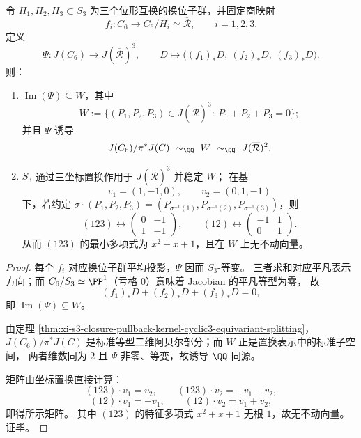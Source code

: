 \begin{proposition}\label{prop:xi-s3-closure-standard-isotypic-explicit-r3-realization}
令 \(H_1,H_2,H_3\subset S_3\) 为三个位形互换的换位子群，并固定商映射
\[
f_i:C_6\to C_6/H_i\simeq \overline{\mathcal R},\qquad i=1,2,3.
\]
定义
\[
\Psi:J(C_6)\longrightarrow J(\overline{\mathcal R})^3,\qquad
D\longmapsto \bigl((f_1)_*D,\ (f_2)_*D,\ (f_3)_*D\bigr).
\]
则：
\begin{enumerate}
  \item \(\operatorname{Im}(\Psi)\subseteq W\)，其中
  \[
  W:=\{(P_1,P_2,P_3)\in J(\overline{\mathcal R})^3:\ P_1+P_2+P_3=0\};
  \]
  并且 \(\Psi\) 诱导
  \[
  J(C_6)/\pi^\ast J(C)\ \sim_{\QQ}\ W\ \sim_{\QQ}\ J(\overline{\mathcal R})^2.
  \]
  \item \(S_3\) 通过三坐标置换作用于 \(J(\overline{\mathcal R})^3\) 并稳定 \(W\)；
  在基
  \[
  v_1=(1,-1,0),\qquad v_2=(0,1,-1)
  \]
  下，若约定
  \(
  \sigma\cdot(P_1,P_2,P_3)=(P_{\sigma^{-1}(1)},P_{\sigma^{-1}(2)},P_{\sigma^{-1}(3)})
  \)，则
  \[
  (123)\longleftrightarrow
  \begin{pmatrix}
  0 & -1\\
  1 & -1
  \end{pmatrix},
  \qquad
  (12)\longleftrightarrow
  \begin{pmatrix}
  -1 & 1\\
  0 & 1
  \end{pmatrix}.
  \]
  从而 \((123)\) 的最小多项式为 \(x^2+x+1\)，且在 \(W\) 上无不动向量。
\end{enumerate}
\end{proposition}

\begin{proof}
每个 \(f_i\) 对应换位子群平均投影，\(\Psi\) 因而 \(S_3\)-等变。
三者求和对应平凡表示方向；而 \(C_6/S_3\simeq\PP^1\)（亏格 \(0\)）意味着 Jacobian 的平凡等型为零，
故
\[
(f_1)_*D+(f_2)_*D+(f_3)_*D=0,
\]
即 \(\operatorname{Im}(\Psi)\subseteq W\)。

由定理 \ref{thm:xi-s3-closure-pullback-kernel-cyclic3-equivariant-splitting}，
\(
J(C_6)/\pi^\ast J(C)
\)
是标准等型二维阿贝尔部分；而 \(W\) 正是置换表示中的标准子空间，
两者维数同为 \(2\) 且 \(\Psi\) 非零、等变，故诱导 \(\QQ\)-同源。

矩阵由坐标置换直接计算：
\[
(123)\cdot v_1=v_2,\qquad
(123)\cdot v_2=-v_1-v_2,
\]
\[
(12)\cdot v_1=-v_1,\qquad
(12)\cdot v_2=v_1+v_2,
\]
即得所示矩阵。
其中 \((123)\) 的特征多项式 \(x^2+x+1\) 无根 \(1\)，故无不动向量。证毕。
\end{proof}

\endinput
